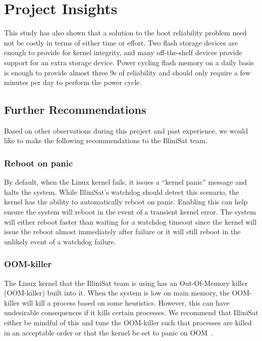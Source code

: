 \section{Project Insights}\label{sec:insights}

This study has also shown that a solution to the boot reliability problem need not be costly in terms of either time or effort.  Two flash storage devices are enough to provide for kernel integrity, and many off-the-shelf devices provide support for an extra storage device.  Power cycling flash memory on a daily basis is enough to provide almost three 9s of reliability and should only require a few minutes per day to perform the power cycle.

\subsection{Further Recommendations}
Based on other observations during this project and past experience, we would
like to make the following recommendations to the IlliniSat team.

\subsubsection{Reboot on panic} By default, when the Linux kernel fails, it
issues a ``kernel panic'' message and halts the system.  While IlliniSat's
watchdog should detect this scenario, the kernel has the ability to
automatically reboot on panic.  Enabling this can help ensure the system will
reboot in the event of a transient kernel error. The system will either reboot
faster than waiting for a watchdog timeout since the kernel will issue the
reboot almost immediately after failure or it will still reboot in the unlikely
event of a watchdog failure.

\subsubsection{OOM-killer} The Linux kernel that the IlliniSat team is using
has an Out-Of-Memory killer (OOM-killer) built into it. When the system is 
low on main memory, the OOM-killer will kill a process based on some heuristics.
However, this can have undesirable consequences if it kills certain processes.
We recommend that IlliniSat either be mindful of this and tune the OOM-killer
such that processes are killed in an acceptable order or that the kernel be set
to panic on OOM~\cite{oracleoom}.

